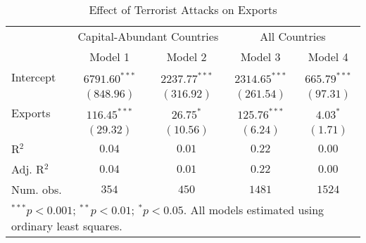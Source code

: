 
\begin{table}
\caption{Effect of Terrorist Attacks on Exports}
\begin{center}
\begin{tabular}{l c c c c}
\hline
 & \multicolumn{2}{c}{Capital-Abundant Countries} & \multicolumn{2}{c}{All Countries} \\
\cline{2-3} \cline{4-5}
 & Model 1 & Model 2 & Model 3 & Model 4 \\
\hline
Intercept  & $6791.60^{***}$ & $2237.77^{***}$ & $2314.65^{***}$ & $665.79^{***}$ \\
           & $(848.96)$      & $(316.92)$      & $(261.54)$      & $(97.31)$      \\
Exports    & $116.45^{***}$  & $26.75^{*}$     & $125.76^{***}$  & $4.03^{*}$     \\
           & $(29.32)$       & $(10.56)$       & $(6.24)$        & $(1.71)$       \\
\hline
R$^2$      & $0.04$          & $0.01$          & $0.22$          & $0.00$         \\
Adj. R$^2$ & $0.04$          & $0.01$          & $0.22$          & $0.00$         \\
Num. obs.  & $354$           & $450$           & $1481$          & $1524$         \\
\hline
\multicolumn{5}{l}{\scriptsize{$^{***}p<0.001$; $^{**}p<0.01$; $^{*}p<0.05$. All models estimated using ordinary least squares.}}
\end{tabular}
\label{table:coefficients}
\end{center}
\end{table}
